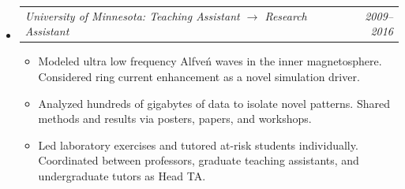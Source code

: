 \documentclass[12pt,letterpaper]{article}
\makeatletter
\newcommand{\headerpair}[2]{
    \begin{tabular*}{\linewidth}{l@{ \extracolsep{\fill} }r} {\large\emph{#1}} & {\large\emph{#2}}
    \end{tabular*}
}
\newcommand{\headerrow}[3]{\headerpair{#2: #1}{#3}}
\makeatother
\begin{document}
\begin{itemize}[leftmargin=\parindent]
\begin{itemize}[leftmargin=\parindent]
        \end{itemize}


    \item[]
        \headerrow
            {Teaching Assistant $\to$ Research Assistant}
            {University of Minnesota}
            {2009--2016}
        \begin{itemize}[leftmargin=\parindent]
            \itemsep=0.3em

            \item Modeled ultra low frequency Alfve\'n waves in the inner magnetosphere. Considered ring current enhancement as a novel simulation driver.
            \item Analyzed hundreds of gigabytes of data to isolate novel patterns. Shared methods and results via posters, papers, and workshops.
            \item Led laboratory exercises and tutored at-risk students individually. Coordinated between professors, graduate teaching assistants, and undergraduate tutors as Head TA.
        \end{itemize}

\end{itemize}
\end{document}
